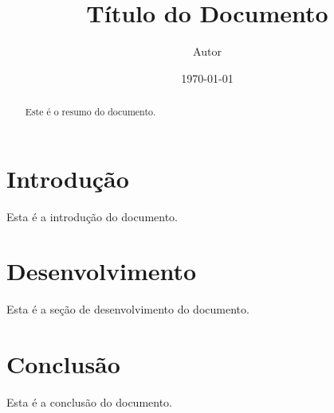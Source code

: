 \documentclass{article}
\begin{document}
\title{Título do Documento}
\author{Autor}
\date{\today}

\maketitle

\begin{abstract}
Este é o resumo do documento.
\end{abstract}

\section{Introdução}
Esta é a introdução do documento.

\section{Desenvolvimento}
Esta é a seção de desenvolvimento do documento.

\section{Conclusão}
Esta é a conclusão do documento.
\end{document}
